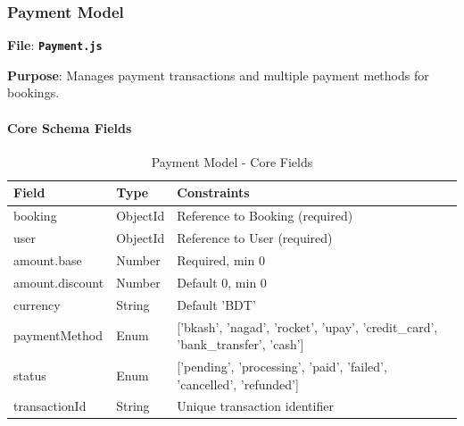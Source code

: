 \documentclass[12pt,a4paper]{article}
\newcommand{\file}[1]{\textbf{\texttt{#1}}}
\begin{document}
\subsubsection{Payment Model}
\label{subsubsec:payment-model}

\textbf{File}: \file{Payment.js}

\textbf{Purpose}: Manages payment transactions and multiple payment methods for bookings.

\paragraph{Core Schema Fields}
\begin{table}[H]
\centering
\small
\begin{tabular}{@{}lll@{}}
\toprule
\textbf{Field} & \textbf{Type} & \textbf{Constraints} \\
\midrule
booking & ObjectId & Reference to Booking (required) \\
user & ObjectId & Reference to User (required) \\
amount.base & Number & Required, min 0 \\
amount.discount & Number & Default 0, min 0 \\
currency & String & Default 'BDT' \\
paymentMethod & Enum & ['bkash', 'nagad', 'rocket', 'upay', 'credit\_card', 'bank\_transfer', 'cash'] \\
status & Enum & ['pending', 'processing', 'paid', 'failed', 'cancelled', 'refunded'] \\
transactionId & String & Unique transaction identifier \\
\bottomrule
\end{tabular}
\caption{Payment Model - Core Fields}
\label{tab:payment-core-schema}
\end{table}
\end{document}
